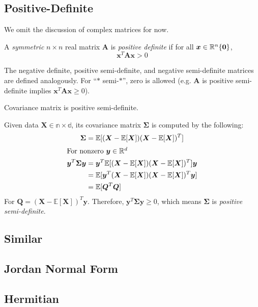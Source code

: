 \subsection{Positive-Definite}
We omit the discussion of complex matrices for now.
\begin{definition}
A \emph{symmetric} $n\times n$ real matrix $\bm{A}$ is \emph{positive definite} if for all $\bm{x}\in\mathbb{R}^n \\ \{\bm{0}\}$, 
\begin{equation}
    \bm{x}^T\bm{Ax} > 0
\end{equation}
\end{definition}
 The negative definite, positive semi-definite, and negative semi-definite matrices are defined analogously. For ``$*$ semi-$*$'', zero is allowed (e.g. $\bm{A}$ is positive semi-definite implies $\bm{x}^T\bm{Ax}\geq 0$).
\begin{theorem}
Covariance matrix is positive semi-definite.
\end{theorem}
\noindent Given data $\bm{X}\in\mathbb{n\times d}$, its covariance matrix $\bm{\Sigma}$ is computed by the following:
\begin{align}
    \bm{\Sigma}&=\mathbb{E}[(\bm{X}-\mathbb{E}[\bm{X}])(\bm{X}-\mathbb{E}[\bm{X}])^T]\\
    \intertext{For nonzero $\bm{y}\in\mathbb{R}^d$}
    \bm{y}^T\bm{\Sigma y} &=  \bm{y}^T\mathbb{E}[(\bm{X}-\mathbb{E}[\bm{X}])(\bm{X}-\mathbb{E}[\bm{X}])^T]\bm{y}\\
    &=  \mathbb{E}[\bm{y}^T(\bm{X}-\mathbb{E}[\bm{X}])(\bm{X}-\mathbb{E}[\bm{X}])^T\bm{y}]\\
    &=  \mathbb{E}[\bm{Q}^T\bm{Q}]
\end{align}
For $\bm{Q}=(\bm{X}-\mathbb{E}[\bm{X}])^T\bm{y}$. Therefore, $\bm{y}^T\bm{\Sigma y}\geq 0$, which means $\bm{\Sigma}$ is \emph{positive semi-definite}.

\subsection{Similar}




\subsection{Jordan Normal Form}
\subsection{Hermitian}